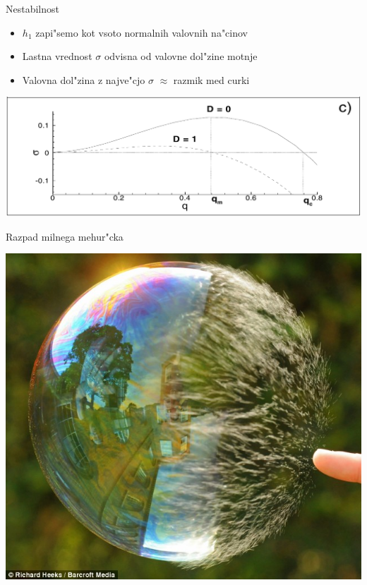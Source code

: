 \documentclass{beamer}
\begin{document}
\begin{frame}{Nestabilnost}
 \begin{itemize}
  \item $h_1$ zapi"semo kot vsoto normalnih valovnih na"cinov
  \item Lastna vrednost $\sigma$ odvisna od valovne dol"zine motnje
  \item Valovna dol"zina z najve"cjo $\sigma$ $\approx$ razmik med curki
 \end{itemize}
 
\begin{center}
 \includegraphics[width=.7\textwidth]{./Slike/film-stabilnost}
 \end{center} 
\end{frame}


\begin{frame}{Razpad milnega mehur"cka}
\begin{center}
 \includegraphics[width=.8\textwidth]{./Slike/bubble-3}
\end{center}
\end{frame}
\end{document}
